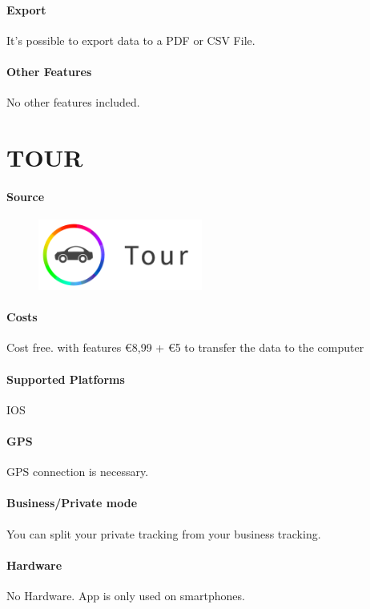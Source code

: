 \paragraph{Export} It’s possible to export data to a PDF or CSV File.
\paragraph{Other Features} No other features included.
\newpage

\section{TOUR}
\paragraph{Source} 
\begin{figure}
  \begin{center}
    \includegraphics[width=0.48\textwidth]{tour}
  \end{center}
\end{figure}
\paragraph{Costs} Cost free. with features \euro 8,99 + \euro 5 to transfer the data to the computer
\paragraph{Supported Platforms} IOS
\paragraph{GPS} GPS connection is necessary.
\paragraph{Business/Private mode} You can split your private tracking from your business tracking.
\paragraph{Hardware} No Hardware. App is only used on smartphones.
